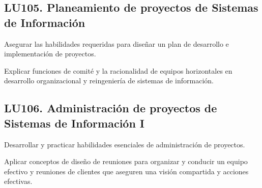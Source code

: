 \subsection{LU105. Planeamiento de proyectos  de Sistemas de Información}\label{sec:BOK-LU105}\label{sec:LU105}
\begin{LearningUnit}
\begin{LUGoal}
\item Asegurar las habilidades requeridas para diseñar un plan de desarrollo e implementación de proyectos.
\end{LUGoal}

\begin{LUObjective}
\item Explicar funciones de comité y la racionalidad de equipos horizontales en desarrollo organizacional y reingeniería de sistemas de información.
\end{LUObjective}
\end{LearningUnit}

\subsection{LU106. Administración de proyectos  de Sistemas de Información I}\label{sec:BOK-LU106}\label{sec:LU106}
\begin{LearningUnit}
\begin{LUGoal}
\item Desarrollar y practicar habilidades esenciales de administración de proyectos.
\end{LUGoal}

\begin{LUObjective}
\item Aplicar conceptos de diseño de reuniones para organizar y conducir un equipo efectivo y reuniones de clientes que aseguren una visión compartida y acciones efectivas.
\end{LUObjective}
\end{LearningUnit}

